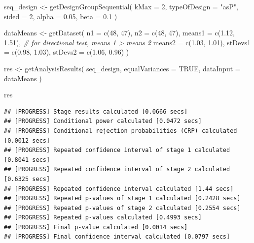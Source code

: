 \documentclass[
  oneside]{krantz}
\makeatletter
\newenvironment{Shaded}{\begin{snugshade}}{\end{snugshade}}
\newcommand{\AttributeTok}[1]{\textcolor[rgb]{0.61,0.61,0.61}{#1}}
\newcommand{\CommentTok}[1]{\textcolor[rgb]{0.37,0.37,0.37}{\textit{#1}}}
\newcommand{\ConstantTok}[1]{\textcolor[rgb]{0,0,0}{#1}}
\newcommand{\DecValTok}[1]{\textcolor[rgb]{0.06,0.06,0.06}{#1}}
\newcommand{\FloatTok}[1]{\textcolor[rgb]{0.06,0.06,0.06}{#1}}
\newcommand{\FunctionTok}[1]{\textcolor[rgb]{0,0,0}{#1}}
\newcommand{\NormalTok}[1]{#1}
\newcommand{\OtherTok}[1]{\textcolor[rgb]{0.37,0.37,0.37}{#1}}
\newcommand{\StringTok}[1]{\textcolor[rgb]{0.5,0.5,0.5}{#1}}
\newenvironment{kframe}{%
\medskip{}
\setlength{\fboxsep}{.8em}
 \def\at@end@of@kframe{}%
 \ifinner\ifhmode%
  \def\at@end@of@kframe{\end{minipage}}%
  \begin{minipage}{\columnwidth}%
 \fi\fi%
 \def\FrameCommand##1{\hskip\@totalleftmargin \hskip-\fboxsep
 \colorbox{shadecolor}{##1}\hskip-\fboxsep
     \hskip-\linewidth \hskip-\@totalleftmargin \hskip\columnwidth}%
 \MakeFramed {\advance\hsize-\width
   \@totalleftmargin\z@ \linewidth\hsize
   \@setminipage}}%
 {\par\unskip\endMakeFramed%
 \at@end@of@kframe}
\renewenvironment{Shaded}{\begin{kframe}}{\end{kframe}}
\makeatother
\begin{document}
\begin{Shaded}
\begin{Highlighting}[]
\NormalTok{seq\_design }\OtherTok{\textless{}{-}} \FunctionTok{getDesignGroupSequential}\NormalTok{(}
  \AttributeTok{kMax =} \DecValTok{2}\NormalTok{,}
  \AttributeTok{typeOfDesign =} \StringTok{"asP"}\NormalTok{,}
  \AttributeTok{sided =} \DecValTok{2}\NormalTok{,}
  \AttributeTok{alpha =} \FloatTok{0.05}\NormalTok{,}
  \AttributeTok{beta =} \FloatTok{0.1}
\NormalTok{)}

\NormalTok{dataMeans }\OtherTok{\textless{}{-}} \FunctionTok{getDataset}\NormalTok{(}
  \AttributeTok{n1 =} \FunctionTok{c}\NormalTok{(}\DecValTok{48}\NormalTok{, }\DecValTok{47}\NormalTok{), }
  \AttributeTok{n2 =} \FunctionTok{c}\NormalTok{(}\DecValTok{48}\NormalTok{, }\DecValTok{47}\NormalTok{), }
  \AttributeTok{means1 =} \FunctionTok{c}\NormalTok{(}\FloatTok{1.12}\NormalTok{, }\FloatTok{1.51}\NormalTok{), }\CommentTok{\# for directional test, means 1 \textgreater{} means 2}
  \AttributeTok{means2 =} \FunctionTok{c}\NormalTok{(}\FloatTok{1.03}\NormalTok{, }\FloatTok{1.01}\NormalTok{),}
  \AttributeTok{stDevs1 =} \FunctionTok{c}\NormalTok{(}\FloatTok{0.98}\NormalTok{, }\FloatTok{1.03}\NormalTok{), }
  \AttributeTok{stDevs2 =} \FunctionTok{c}\NormalTok{(}\FloatTok{1.06}\NormalTok{, }\FloatTok{0.96}\NormalTok{)}
\NormalTok{  )}

\NormalTok{res }\OtherTok{\textless{}{-}} \FunctionTok{getAnalysisResults}\NormalTok{(}
\NormalTok{  seq\_design, }
  \AttributeTok{equalVariances =} \ConstantTok{TRUE}\NormalTok{,}
  \AttributeTok{dataInput =}\NormalTok{ dataMeans}
\NormalTok{  )}

\NormalTok{res}
\end{Highlighting}
\end{Shaded}

\begin{verbatim}
## [PROGRESS] Stage results calculated [0.0666 secs] 
## [PROGRESS] Conditional power calculated [0.0472 secs] 
## [PROGRESS] Conditional rejection probabilities (CRP) calculated [0.0012 secs] 
## [PROGRESS] Repeated confidence interval of stage 1 calculated [0.8041 secs] 
## [PROGRESS] Repeated confidence interval of stage 2 calculated [0.6325 secs] 
## [PROGRESS] Repeated confidence interval calculated [1.44 secs] 
## [PROGRESS] Repeated p-values of stage 1 calculated [0.2428 secs] 
## [PROGRESS] Repeated p-values of stage 2 calculated [0.2554 secs] 
## [PROGRESS] Repeated p-values calculated [0.4993 secs] 
## [PROGRESS] Final p-value calculated [0.0014 secs] 
## [PROGRESS] Final confidence interval calculated [0.0797 secs]
\end{verbatim}
\end{document}
